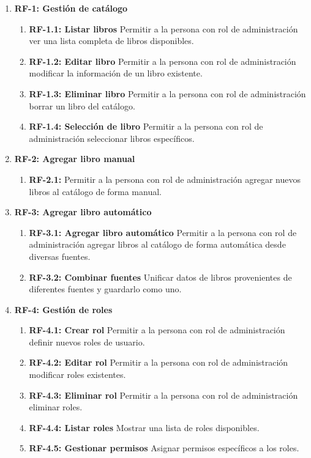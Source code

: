 \begin{enumerate}
    \item \textbf{RF-1: Gestión de catálogo}
    \begin{enumerate}
        \item \textbf{RF-1.1: Listar libros} Permitir a la persona con rol de administración ver una lista completa de libros disponibles.
        \item \textbf{RF-1.2: Editar libro} Permitir a la persona con rol de administración modificar la información de un libro existente.
        \item \textbf{RF-1.3: Eliminar libro} Permitir a la persona con rol de administración borrar un libro del catálogo.
        \item \textbf{RF-1.4: Selección de libro} Permitir a la persona con rol de administración seleccionar libros específicos.
    \end{enumerate}

    \item \textbf{RF-2: Agregar libro manual}
    \begin{enumerate}
        \item \textbf{RF-2.1:} Permitir a la persona con rol de administración agregar nuevos libros al catálogo de forma manual.
    \end{enumerate}

    \item \textbf{RF-3: Agregar libro automático}
    \begin{enumerate}
        \item \textbf{RF-3.1: Agregar libro automático} Permitir a la persona con rol de administración agregar libros al catálogo de forma automática desde diversas fuentes.
        \item \textbf{RF-3.2: Combinar fuentes} Unificar datos de libros provenientes de diferentes fuentes y guardarlo como uno.
    \end{enumerate}

    \item \textbf{RF-4: Gestión de roles}
    \begin{enumerate}
        \item \textbf{RF-4.1: Crear rol} Permitir a la persona con rol de administración definir nuevos roles de usuario.
        \item \textbf{RF-4.2: Editar rol} Permitir a la persona con rol de administración modificar roles existentes.
        \item \textbf{RF-4.3: Eliminar rol} Permitir a la persona con rol de administración eliminar roles.
        \item \textbf{RF-4.4: Listar roles} Mostrar una lista de roles disponibles.
        \item \textbf{RF-4.5: Gestionar permisos} Asignar permisos específicos a los roles.
    \end{enumerate}


\end{enumerate}
